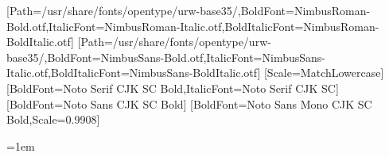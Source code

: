 \usepackage{fontspec}
\usepackage{xeCJK}
\setmainfont{NimbusRoman-Regular.otf}[Path=/usr/share/fonts/opentype/urw-base35/,BoldFont=NimbusRoman-Bold.otf,ItalicFont=NimbusRoman-Italic.otf,BoldItalicFont=NimbusRoman-BoldItalic.otf]
\setsansfont{NimbusSans-Regular.otf}[Path=/usr/share/fonts/opentype/urw-base35/,BoldFont=NimbusSans-Bold.otf,ItalicFont=NimbusSans-Italic.otf,BoldItalicFont=NimbusSans-BoldItalic.otf]
\setmonofont{DejaVu Sans Mono}[Scale=MatchLowercase]
[BoldFont={Noto Serif CJK SC Bold},ItalicFont={Noto Serif CJK SC}]
[BoldFont={Noto Sans CJK SC Bold}]
[BoldFont={Noto Sans Mono CJK SC Bold},Scale=0.9908]
\renewcommand{\abstractname}{摘要}
\renewcommand{\figurename}{图}
\renewcommand{\tablename}{表}
\renewcommand{\appendixname}{附录}
\renewcommand{\refname}{参考文献}
\providecommand{\proofname}{证明}
\renewcommand{\proofname}{证明}
\usepackage{etoolbox}
\makeatletter
{}
\makeatother
\emergencystretch=1em
